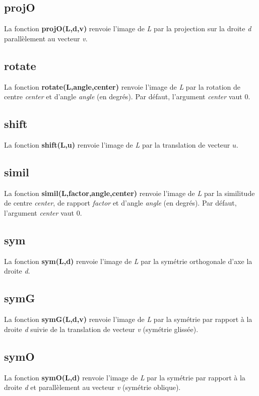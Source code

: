 \documentclass[%
10pt,%
a4paper,%
french,%
]%
{article}%
\begin{document}
\subsection{projO}
La fonction \textbf{projO(L,d,v)} renvoie l'image de \emph{L} par la projection sur la droite \emph{d} parallèlement au vecteur \emph{v}.

\subsection{rotate}
La fonction \textbf{rotate(L,angle,center)} renvoie l'image de \emph{L} par la rotation de centre \emph{center} et d'angle \emph{angle} (en degrés). Par défaut, l'argument \emph{center} vaut 0.  

\subsection{shift}
La fonction \textbf{shift(L,u)} renvoie l'image de \emph{L} par la translation de vecteur \(u\).

\subsection{simil}
La fonction \textbf{simil(L,factor,angle,center)} renvoie l'image de \emph{L} par la similitude de centre \emph{center}, de rapport \emph{factor} et d'angle \emph{angle} (en degrés). Par défaut, l'argument \emph{center} vaut 0.

\subsection{sym}
La fonction \textbf{sym(L,d)} renvoie l'image de \emph{L} par la symétrie orthogonale d'axe la droite \emph{d}.

\subsection{symG}
La fonction \textbf{symG(L,d,v)} renvoie l'image de \emph{L} par la symétrie par rapport à la droite \emph{d} suivie de la translation de vecteur \emph{v} (symétrie glissée).

\subsection{symO}
La fonction \textbf{symO(L,d)} renvoie l'image de \emph{L} par la symétrie par rapport à la droite \emph{d} et parallèlement au vecteur \emph{v} (symétrie oblique).
\end{document}
